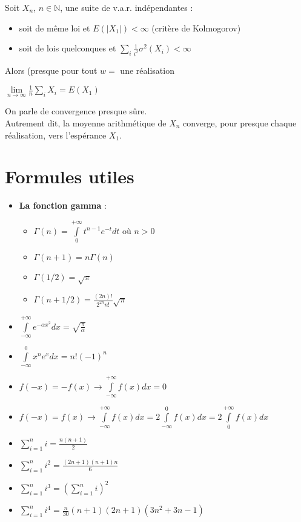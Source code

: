 \documentclass[a4paper,11pt]{report}
\begin{document}
\begin{itemize}
\begin{itemize}
		Soit $X_n$, $n \in \mathbb{N}$, une suite de v.a.r. indépendantes :
		\begin{itemize}
			\item soit de même loi et $E(|X_1|) < \infty$ (critère de Kolmogorov)
			\item soit de lois quelconques et $\sum\limits_{i}{}\frac{1}{i^2}\sigma^2(X_i) < \infty$
		\end{itemize}
		Alors (presque pour tout $w =$ une réalisation\\
		\begin{center}
		$\lim\limits_{n \rightarrow \infty}\frac{1}{n}\sum\limits_{i}{X_i} = E(X_1)$
		\end{center}
	\end{itemize}
	On parle de convergence presque sûre.\\
	Autrement dit, la moyenne arithmétique de $X_n$ converge, pour presque chaque réalisation, vers l'espérance $X_1$.
\end{itemize}

\section{Formules utiles}
\begin{itemize}
\item \textbf{La fonction gamma} :
	\begin{itemize}
		\item $\Gamma(n)=\int\limits_{0}^{+\infty}{t^{n-1}e^{-t}dt}$ où $n > 0$
		\item $\Gamma(n+1)=n\Gamma(n)$
		\item $\Gamma(1/2)=\sqrt{\pi}$
		\item $\Gamma(n+1/2)=\frac{(2n)!}{2^{2n}n!}\sqrt{\pi}$
	\end{itemize}
\item $\int\limits_{-\infty}^{+\infty}{e^{-\alpha x^2}dx}=\sqrt{\frac{\pi}{\alpha}}$
\item $\int\limits_{-\infty}^{0}{x^ne^xdx}=n!(-1)^n$
\item $f(-x) = -f(x) \rightarrow \int\limits_{-\infty}^{+\infty}{f(x)dx}=0$
\item $f(-x) = f(x) \rightarrow \int\limits_{-\infty}^{+\infty}{f(x)dx} = 2\int\limits_{-\infty}^{0}{f(x)dx} = 2\int\limits_{0}^{+\infty}{f(x)dx}$
\item $\sum\limits_{i=1}^{n}{i} = \frac{n(n+1)}{2}$
\item $\sum\limits_{i=1}^{n}{i^2} = \frac{(2n+1)(n+1)n}{6}$
\item $\sum\limits_{i=1}^{n}{i^3} = (\sum\limits_{i=1}^{n}{i})^2$
\item $\sum\limits_{i=1}^{n}{i^4} = \frac{n}{30}(n+1)(2n+1)(3n^2+3n-1)$
\end{itemize}
\end{document}
